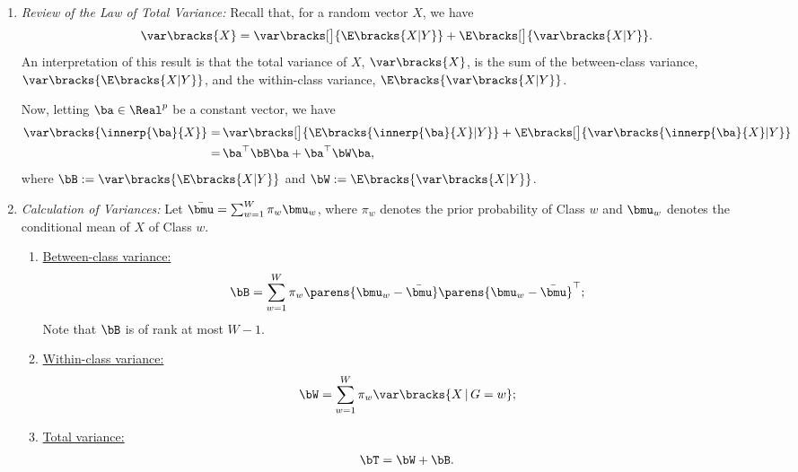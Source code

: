 \documentclass[12pt]{article}
\begin{document}
\begin{enumerate}[label=\textbf{\arabic*.}]
\begin{enumerate}
		\item \textit{Review of the Law of Total Variance:} Recall that, for a random vector $X$, we have 
		\begin{align*}
			\var \bracks{X} = \var \bracks[\big]{ \E \bracks{X \vert Y} } + \E \bracks[\big]{ \var \bracks{X \vert Y} }. 
		\end{align*}
		An interpretation of this result is that the total variance of $X$, $\var \bracks{X}$, is the sum of the between-class variance, $\var \bracks{ \E \bracks{X \vert Y} }$, and the within-class variance, $\E \bracks{ \var \bracks{X \vert Y} }$. 
		
		Now, letting $\ba \in \Real^p$ be a constant vector, we have 
		\begin{align*}
			\var \bracks{ \innerp{\ba}{X} } = & \, \var \bracks[\big]{ \E \bracks{ \innerp{\ba}{X} \vert Y} } + \E \bracks[\big]{ \var \bracks{\innerp{\ba}{X} \vert Y} } \\ 
			= & \, \ba^\top \bB \ba + \ba^\top \bW \ba, 
		\end{align*}
		where $\bB := \var \bracks{ \E \bracks{X \vert Y} }$ and $\bW := \E \bracks{ \var \bracks{X \vert Y} }$. 
		
		\item \textit{Calculation of Variances:} Let $\bar{\bmu} = \sum_{w=1}^W \pi_w \bmu_w$, where $\pi_w$ denotes the prior probability of Class $w$ and $\bmu_w$ denotes the conditional mean of $X$ of Class $w$. 
		\begin{enumerate}
			\item \underline{Between-class variance:} 
			\begin{align*}
				\bB = \sum_{w=1}^W \pi_w \parens{\bmu_w - \bar{\bmu}} \parens{\bmu_w - \bar{\bmu}}^\top; 
			\end{align*}
			Note that $\bB$ is of rank at most $W - 1$. 
			
			\item \underline{Within-class variance:} 
			\begin{align*}
				\bW = \sum_{w=1}^W \pi_w \var \bracks{X \,\vert\, G = w}; 
			\end{align*}
			
			\item \underline{Total variance:} 
			\begin{align*}
				\bT = \bW + \bB. 
			\end{align*}
		\end{enumerate}
		

\end{enumerate}
\end{enumerate}
\end{document}

